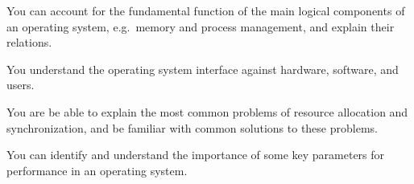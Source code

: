 \item You can account for the fundamental function of the main logical 
components of an operating system, e.g.\ memory and process management, and 
explain their relations.
\item You understand the operating system interface against hardware, software, 
and users.
\item You are be able to explain the most common problems of resource 
allocation and synchronization, and be familiar with common solutions to these 
problems.
\item You can identify and understand the importance of some key parameters for 
performance in an operating system.
